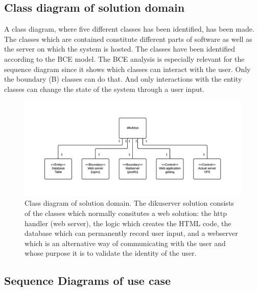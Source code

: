 \documentclass[11pt,a4paper]{report}
\begin{document}
\subsection{Class diagram of solution domain}\label{subsec:class_diagram}
A class diagram, where five different classes has been identified, has been made. The classes which are contained constitute different parts of software as well as the server on which the system is hosted. The classes have been identified according to the BCE model. The BCE analysis is especially relevant for the sequence diagram since it shows which classes can interact with the user. Only the boundary (B) classes can do that. And only interactions with the entity classes can change the state of the system through a user input.
\begin{figure}[H]
    \centering
    \includegraphics[width=1.2\textwidth]{pictures/class_diagram}
    \caption{Class diagram of solution domain. The dikuserver solution consists of the classes which normally consitutes a web solution: the http handler (web server), the logic which creates the HTML code, the database which can permanently record user input, and a webserver which is an alternative way of communicating with the user and whose purpose it is to validate the identity of the user.}
    \label{fig:class_diagram}
\end{figure}
\subsection*{}

\subsection{Sequence Diagrams of use case}\label{subsec:Sequence_diagram_Use_case_model}
\end{document}
